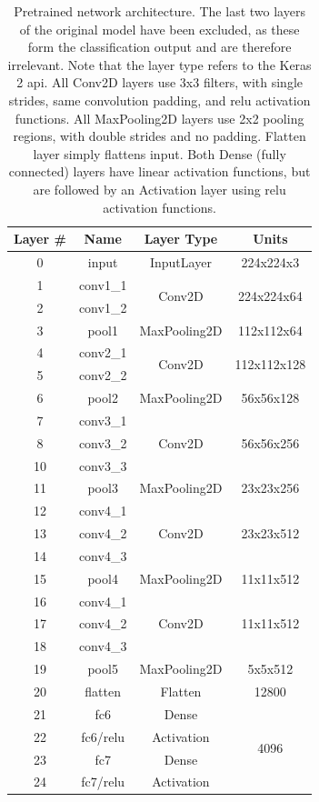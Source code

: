 \begin{table}[h!]
\begin{center}
\begin{tabular}{|c|c|c|c|}
\hline
\textbf{Layer \#} & \textbf{Name} & \textbf{Layer Type} & \textbf{Units} \\ \hline
0 & input & InputLayer & 224x224x3  \\ \hline
1 & conv1\_1 & \multirow{2}{*}{Conv2D} & \multirow{2}{*}{224x224x64} \\ \cline{1-2}
2 & conv1\_2 & & \\ \hline
3 & pool1 & MaxPooling2D & 112x112x64 \\ \hline
4 & conv2\_1 & \multirow{2}{*}{Conv2D} & \multirow{2}{*}{112x112x128} \\ \cline{1-2}
5 & conv2\_2 & & \\ \hline
6 & pool2 & MaxPooling2D & 56x56x128 \\ \hline
7 & conv3\_1 & \multirow{3}{*}{Conv2D} & \multirow{3}{*}{56x56x256} \\ \cline{1-2}
8 & conv3\_2 & & \\ \cline{1-2}
10 & conv3\_3 & & \\ \hline
11 & pool3 & MaxPooling2D & 23x23x256 \\ \hline
12 & conv4\_1 & \multirow{3}{*}{Conv2D} & \multirow{3}{*}{23x23x512} \\ \cline{1-2}
13 & conv4\_2 & & \\ \cline{1-2}
14 & conv4\_3 & & \\ \hline
15 & pool4 & MaxPooling2D & 11x11x512 \\ \hline
16 & conv4\_1 & \multirow{3}{*}{Conv2D} & \multirow{3}{*}{11x11x512} \\ \cline{1-2}
17 & conv4\_2 & & \\ \cline{1-2}
18 & conv4\_3 & & \\ \hline
19 & pool5 & MaxPooling2D & 5x5x512 \\ \hline
20 & flatten & Flatten & 12800 \\ \hline
21 & fc6 & Dense & \multirow{4}{*}{4096} \\ \cline{1-3}
22 & fc6/relu & Activation & \\ \cline{1-3}
23 & fc7 & Dense & \\ \cline{1-3}
24 & fc7/relu & Activation & \\ \hline
\end{tabular}
\end{center}
\caption[Pretrained network architecture]{Pretrained network architecture. The last two layers of the original model have been excluded, as these form the classification output and are therefore irrelevant. Note that the layer type refers to the Keras 2 \acrshort{api}. All Conv2D layers use 3x3 filters, with single strides, same convolution padding, and \acrshort{relu} activation functions. All MaxPooling2D layers use 2x2 pooling regions, with double strides and no padding. Flatten layer simply flattens input. Both Dense (fully connected) layers have linear activation functions, but are followed by an Activation layer using \acrshort{relu} activation functions.}
\label{tab:vggface-arch}
\end{table}

